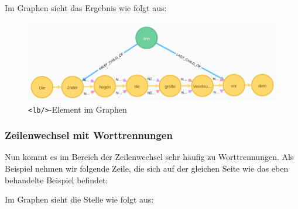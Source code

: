 Im Graphen sieht das Ergebnis wie folgt aus:

\begin{figure}
\centering
\includegraphics{Bilder/TEI2Graph/lb-to-line.png}
\caption{\texttt{\textless{}lb/\textgreater{}}-Element im Graphen}
\end{figure}

\hypertarget{zeilenwechsel-mit-worttrennungen}{%
\subsubsection{Zeilenwechsel mit
Worttrennungen}\label{zeilenwechsel-mit-worttrennungen}}

Nun kommt es im Bereich der Zeilenwechsel sehr häufig zu Worttrennungen.
Als Beispiel nehmen wir folgende Zeile, die sich auf der gleichen Seite
wie das eben behandelte Beispiel befindet:

\begin{Shaded}
\begin{Highlighting}[]
\end{Highlighting}
\end{Shaded}

Im Graphen sieht die Stelle wie folgt aus:

